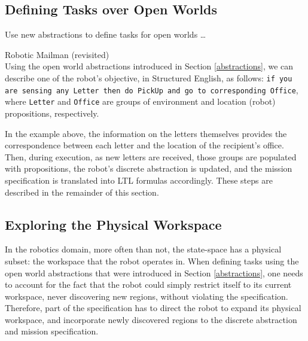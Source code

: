 \subsection{Defining Tasks over Open Worlds}

Use new abstractions to define tasks for open worlds \ldots

\begin{myExample}\label{Ex:mailman2} Robotic Mailman (revisited)\\
	Using the open world abstractions introduced in Section \ref{abstractions}, we can describe one of the robot's objective, in Structured English, as follows: 
\texttt{if you are sensing any Letter then do PickUp and go to corresponding Office}, where \texttt{Letter} and \texttt{Office} are groups of environment and location (robot) propositions, respectively.
\end{myExample}

In the example above, the information on the letters themselves provides the correspondence between each letter and the location of the recipient's office. Then, during execution, as new letters are received, those groups are populated with propositions, the robot's discrete abstraction is updated, and the mission specification is translated into LTL formulas accordingly. These steps are described in the remainder of this section.

\subsection{Exploring the Physical Workspace}

In the robotics domain, more often than not, the state-space has a physical subset: the workspace that the robot operates in. When defining tasks using the open world abstractions that were introduced in Section \ref{abstractions}, one needs to account for the fact that the robot could simply restrict itself to its current workspace, never discovering new regions, without violating the specification. Therefore, part of the specification has to direct the robot to expand its physical workspace, and incorporate newly discovered regions to the discrete abstraction and mission specification.

